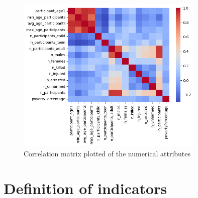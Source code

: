 \documentclass[11pt,a4paper]{report}
\begin{document}
\begin{figure}[h]
	\includegraphics[width=0.8\textwidth]{corr_matrix}
	\centering
	\caption{Correlation matrix plotted of the numerical attributes}
	\label{corr_matrix}
\end{figure}

\section{Definition of indicators}
\end{document}
